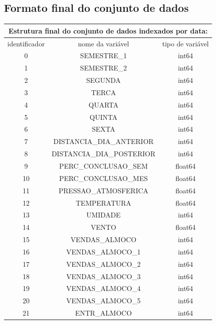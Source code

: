 	\subsection{Formato final do conjunto de dados}
       \begin{table}[!ht]
            \centering
            \begin{tabular}{|c|c|c|} \hline
                \multicolumn{3}{c}{ Estrutura final do conjunto de dados indexados por data: } \\
                \hline
                identificador &	nome da variável					&tipo de variável\\ 
                \hline
                0&	SEMESTRE\_1					&int64 \\
                1&	SEMESTRE\_2					&int64\\
                2&	SEGUNDA						&int64 \\
                3&	TERCA						&int64 \\
                4&	QUARTA						&int64 \\ 
                5&	QUINTA						&int64 \\ 
                6&	SEXTA						&int64 \\ 
                7&	DISTANCIA\_DIA\_ANTERIOR	&	int64 \\ 
                8&	DISTANCIA\_DIA\_POSTERIOR	&	int64 \\
                9&	PERC\_CONCLUSAO\_SEM		&	float64 \\
                10&	PERC\_CONCLUSAO\_MES		&	float64 \\
                11&	PRESSAO\_ATMOSFERICA		&	float64 \\
                12&	TEMPERATURA					&float64 \\ 
                13&	UMIDADE						&int64 \\
                14&	VENTO						&float64\\ 
                15&	VENDAS\_ALMOCO				&int64 \\
                16&	VENDAS\_ALMOCO\_1			&	int64 \\ 
                17&	VENDAS\_ALMOCO\_2			&	int64 \\
                18&	VENDAS\_ALMOCO\_3			&	int64\\ 
                19&	VENDAS\_ALMOCO\_4			&	int64 \\
                20&	VENDAS\_ALMOCO\_5			&	int64 \\ 
                21&	ENTR\_ALMOCO				&	int64\\

\end{tabular}
\end{table}
